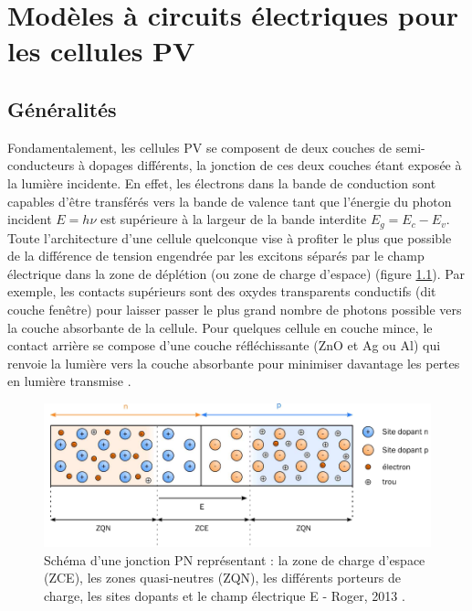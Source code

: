 \chapter{Modèles à circuits électriques pour les cellules PV}

\section{Généralités}

Fondamentalement, les cellules PV se composent de deux couches de semi-conducteurs à dopages différents, la jonction de ces deux couches étant exposée à la lumière incidente. En effet, les électrons dans la bande de conduction sont capables d'être transférés vers la bande de valence tant que l'énergie du photon incident $E = h \nu$ est supérieure à la largeur de la bande interdite $E_g = E_c - E_v$. Toute l'architecture d'une cellule quelconque vise à profiter le plus que possible de la différence de tension engendrée par les excitons séparés par le champ électrique dans la zone de déplétion (ou zone de charge d'espace) (figure \ref{fig:pn}). Par exemple, les contacts supérieurs sont des oxydes transparents conductifs (dit couche fenêtre) pour laisser passer le plus grand nombre de photons possible vers la couche absorbante de la cellule. Pour quelques cellule en couche mince, le contact arrière se compose d'une couche réfléchissante (ZnO et Ag ou Al) qui renvoie la lumière vers la couche absorbante pour minimiser davantage les pertes en lumière transmise \cite{Chopra2004}.\\

\begin{figure}
  \begin{center}
    \includegraphics[width=.7\textwidth]{resources/pn.PNG}
    \caption{Schéma d'une jonction PN représentant : la zone de charge d'espace
(ZCE), les zones quasi-neutres (ZQN), les différents porteurs de charge, les sites dopants et le champ électrique E - Roger, 2013 \cite{Roger2013}.}
    \label{fig:pn}
  \end{center}
\end{figure}  

